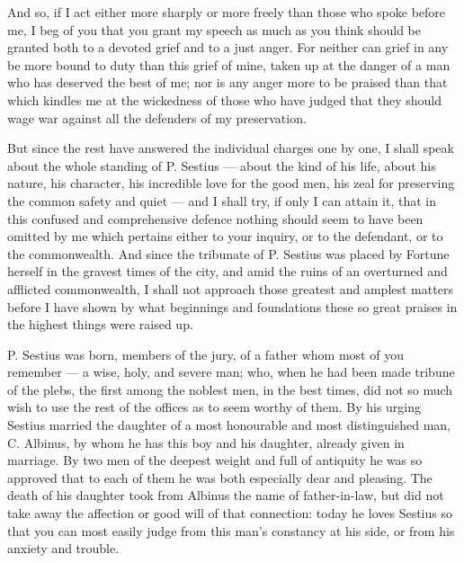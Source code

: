  And so, if I act either more sharply or more freely than those who spoke before me, I beg of you that you grant my speech as much as you think should be granted both to a devoted grief and to a just anger. For neither can grief in any be more bound to duty than this grief of mine, taken up at the danger of a man who has deserved the best of me; nor is any anger more to be praised than that which kindles me at the wickedness of those who have judged that they should wage war against all the defenders of my preservation.

 But since the rest have answered the individual charges one by one, I shall speak about the whole standing of P. Sestius --- about the kind of his life, about his nature, his character, his incredible love for the good men, his zeal for preserving the common safety and quiet --- and I shall try, if only I can attain it, that in this confused and comprehensive defence nothing should seem to have been omitted by me which pertains either to your inquiry, or to the defendant, or to the commonwealth. And since the tribunate of P. Sestius was placed by Fortune herself in the gravest times of the city, and amid the ruins of an overturned and afflicted commonwealth, I shall not approach those greatest and amplest matters before I have shown by what beginnings and foundations these so great praises in the highest things were raised up.

 P. Sestius was born, members of the jury, of a father whom most of you remember --- a wise, holy, and severe man; who, when he had been made tribune of the plebs, the first among the noblest men, in the best times, did not so much wish to use the rest of the offices as to seem worthy of them. By his urging Sestius married the daughter of a most honourable and most distinguished man, C. Albinus, by whom he has this boy and his daughter, already given in marriage. By two men of the deepest weight and full of antiquity he was so approved that to each of them he was both especially dear and pleasing. The death of his daughter took from Albinus the name of father-in-law, but did not take away the affection or good will of that connection: today he loves Sestius so that you can most easily judge from this man's constancy at his side, or from his anxiety and trouble.

